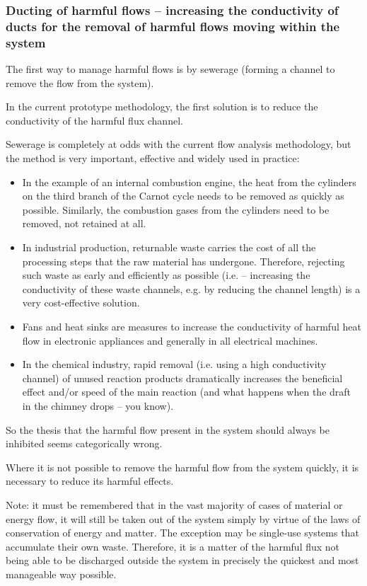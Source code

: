 \documentclass[a4paper,11pt]{article}
\begin{document}
\subsubsection{Ducting of harmful flows -- increasing the conductivity of
  ducts for the removal of harmful flows moving within the system} 

The first way to manage harmful flows is by sewerage (forming a channel to
remove the flow from the system).

In the current prototype methodology, the first solution is to reduce the
conductivity of the harmful flux channel.

Sewerage is completely at odds with the current flow analysis methodology, but
the method is very important, effective and widely used in practice:
\begin{itemize}
\item In the example of an internal combustion engine, the heat from the
  cylinders on the third branch of the Carnot cycle needs to be removed as
  quickly as possible. Similarly, the combustion gases from the cylinders need
  to be removed, not retained at all.
\item In industrial production, returnable waste carries the cost of all the
  processing steps that the raw material has undergone. Therefore, rejecting
  such waste as early and efficiently as possible (i.e. -- increasing the
  conductivity of these waste channels, e.g. by reducing the channel length)
  is a very cost-effective solution.
\item Fans and heat sinks are measures to increase the conductivity of harmful
  heat flow in electronic appliances and generally in all electrical machines.
\item In the chemical industry, rapid removal (i.e. using a high conductivity
  channel) of unused reaction products dramatically increases the beneficial
  effect and/or speed of the main reaction (and what happens when the draft in
  the chimney drops -- you know).
\end{itemize}
So the thesis that the harmful flow present in the system should always be
inhibited seems categorically wrong.

Where it is not possible to remove the harmful flow from the system quickly,
it is necessary to reduce its harmful effects.

Note: it must be remembered that in the vast majority of cases of material or
energy flow, it will still be taken out of the system simply by virtue of the
laws of conservation of energy and matter. The exception may be single-use
systems that accumulate their own waste. Therefore, it is a matter of the
harmful flux not being able to be discharged outside the system in precisely
the quickest and most manageable way possible.
\end{document}
